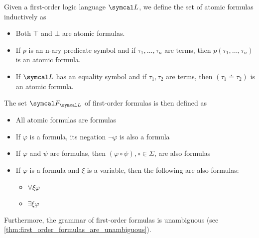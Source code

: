 \begin{definition}\label{def:first_order_formula}\cite[189]{OpenLogic20201202}
  Given a first-order logic language \( \Cal{L} \), we define the set of atomic formulas inductively as
  \begin{itemize}
    \item Both \( \top \) and \( \bot \) are atomic formulas.
    \item If \( p \) is an n-ary predicate symbol and if \( \tau_1, \ldots, \tau_n \) are terms, then \( p(\tau_1, \ldots, \tau_n) \) is an atomic formula.
    \item If \( \Cal{L} \) has an equality symbol and if \( \tau_1, \tau_2 \) are terms, then \( (\tau_1 \doteq \tau_2) \) is an atomic formula.
  \end{itemize}

  The set \( \Cal{F}_{\Cal{L}} \) of first-order formulas is then defined as
  \begin{itemize}
    \item All atomic formulas are formulas
    \item If \( \varphi \) is a formula, its negation \( \neg \varphi \) is also a formula
    \item If \( \varphi \) and \( \psi \) are formulas, then \( (\varphi \circ \psi), \circ \in \Sigma \), are also formulas
    \item If \( \varphi \) is a formula and \( \xi \) is a variable, then the following are also formulas:
    \begin{itemize}
      \item \( \forall \xi \varphi \)
      \item \( \exists \xi \varphi \)
    \end{itemize}
  \end{itemize}

  Furthermore, the grammar of first-order formulas is unambiguous (see \cref{thm:first_order_formulas_are_unambiguous}).


\end{definition}
